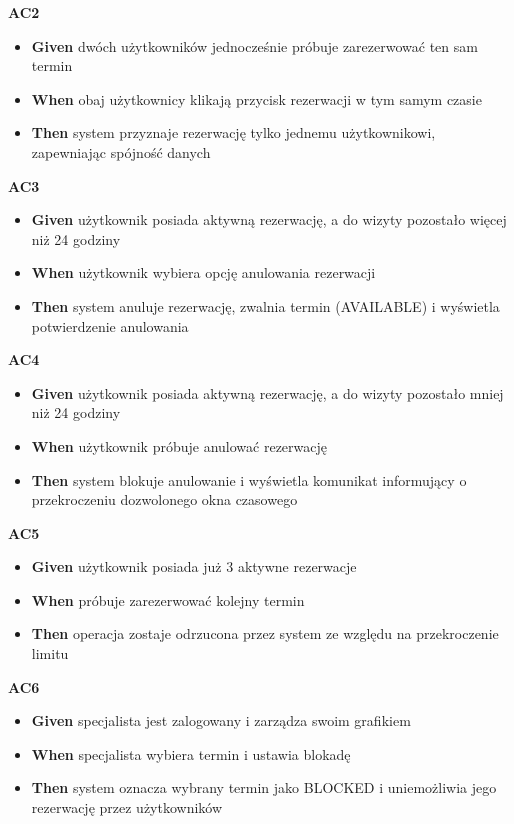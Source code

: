 \documentclass[12pt,a4paper]{article}
\begin{document}
\vspace{0.4em}
\textbf{AC2}
\begin{itemize}[itemsep=2pt]
  \item \textbf{Given} dwóch użytkowników jednocześnie próbuje zarezerwować ten sam termin
  \item \textbf{When} obaj użytkownicy klikają przycisk rezerwacji w tym samym czasie
  \item \textbf{Then} system przyznaje rezerwację tylko jednemu użytkownikowi, zapewniając spójność danych
\end{itemize}

\vspace{0.4em}
\textbf{AC3}
\begin{itemize}[itemsep=2pt]
  \item \textbf{Given} użytkownik posiada aktywną rezerwację, a do wizyty pozostało więcej niż 24 godziny
  \item \textbf{When} użytkownik wybiera opcję anulowania rezerwacji
  \item \textbf{Then} system anuluje rezerwację, zwalnia termin (AVAILABLE) i wyświetla potwierdzenie anulowania
\end{itemize}

\vspace{0.4em}
\textbf{AC4}
\begin{itemize}[itemsep=2pt]
  \item \textbf{Given} użytkownik posiada aktywną rezerwację, a do wizyty pozostało mniej niż 24 godziny
  \item \textbf{When} użytkownik próbuje anulować rezerwację
  \item \textbf{Then} system blokuje anulowanie i wyświetla komunikat informujący o przekroczeniu dozwolonego okna czasowego
\end{itemize}

\vspace{0.4em}
\textbf{AC5}
\begin{itemize}[itemsep=2pt]
  \item \textbf{Given} użytkownik posiada już 3 aktywne rezerwacje
  \item \textbf{When} próbuje zarezerwować kolejny termin
  \item \textbf{Then} operacja zostaje odrzucona przez system ze względu na przekroczenie limitu
\end{itemize}

\vspace{0.4em}
\textbf{AC6}
\begin{itemize}[itemsep=2pt]
  \item \textbf{Given} specjalista jest zalogowany i zarządza swoim grafikiem
  \item \textbf{When} specjalista wybiera termin i ustawia blokadę
  \item \textbf{Then} system oznacza wybrany termin jako BLOCKED i uniemożliwia jego rezerwację przez użytkowników
\end{itemize}
\end{document}
